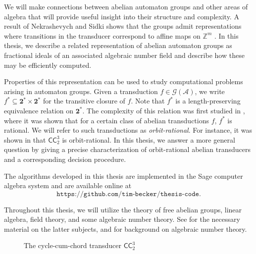 \documentclass[12pt, letterpaper]{article}
\newcommand{\Z}{\mathbb Z}
\newcommand{\bin}{\mathbf 2}
\newcommand{\A}{\mathcal A}
\newcommand{\CC}{\mathsf{CC}}
\newcommand{\gp}{\mathcal G}
\newcommand{\codeurl}{\texttt{https://github.com/tim-becker/thesis-code}}
\begin{document}
We will make connections between abelian automaton groups and other areas of
algebra that will provide useful insight into their structure and complexity.
A result of Nekrashevych and Sidki shows that the groups admit representations
where transitions in the transducer correspond to affine maps on $\Z^m$
\cite{nekrashevych2004automorphisms}.  In this thesis, we describe a related
representation of abelian automaton groups as fractional ideals of an
associated algebraic number field and describe how these may be efficiently
computed.

Properties of this representation can be used to study computational problems
arising in automaton groups. Given a transduction $f \in \gp(\A)$, we write
$f^* \subseteq \bin^* \times \bin^*$ for the transitive closure of $f$.  Note
that $f^*$ is a length-preserving equivalence relation on $\bin^*$.  The
complexity of this relation was first studied in \cite{jalc170214}, where it
was shown that for a certain class of abelian transductions $f$, $f^*$ is
rational. We will refer to such transductions as \emph{orbit-rational}. For
instance, it was shown in \cite{jalc170214} that $\CC^3_2$ is orbit-rational.
In this thesis, we answer a more general question by giving a precise
characterization of orbit-rational abelian transducers and a corresponding
decision procedure.

The algorithms developed in this thesis are implemented in the Sage computer
algebra system and are available online at
\[
    \codeurl.
\]

Throughout this thesis, we will utilize the theory of free abelian groups,
linear algebra, field theory, and some algebraic number theory. See
\cite{Hungerford78} for the necessary material on the latter subjects, and
\cite{ireland1990classical, stein2012algebraic} for background on algebraic
number theory.
\begin{figure}
    \centering
    \caption{The cycle-cum-chord transducer $\CC^3_2$}
    \label{fig:cc-3-2}
\end{figure}
\end{document}
